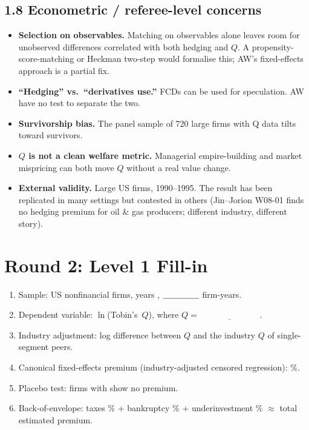 \documentclass[11pt]{article}
\newcommand{\blank}[1]{\underline{\hspace{#1}}}
\begin{document}
\subsection*{1.8 Econometric / referee-level concerns}
\begin{alertbox}
\begin{itemize}
\item \textbf{Selection on observables.} Matching on observables alone leaves room for unobserved differences correlated with both hedging and $Q$. A propensity-score-matching or Heckman two-step would formalise this; AW's fixed-effects approach is a partial fix.
\item \textbf{``Hedging'' vs.\ ``derivatives use.''} FCDs can be used for speculation. AW have no test to separate the two.
\item \textbf{Survivorship bias.} The panel sample of 720 large firms with Q data tilts toward survivors.
\item \textbf{$Q$ is not a clean welfare metric.} Managerial empire-building and market mispricing can both move $Q$ without a real value change.
\item \textbf{External validity.} Large US firms, 1990--1995. The result has been replicated in many settings but contested in others (Jin--Jorion W08-01 finds no hedging premium for oil \& gas producers; different industry, different story).
\end{itemize}
\end{alertbox}

\section*{Round 2: Level 1 Fill-in}
\begin{enumerate}
\item Sample: \blank{1cm} US nonfinancial firms, years \blank{2cm}, $\blank{1.5cm}$ firm-years.
\item Dependent variable: $\ln$(Tobin's~$Q$), where $Q=\blank{3cm}$.
\item Industry adjustment: log difference between $Q$ and the \blank{1.5cm} industry $Q$ of single-segment peers.
\item Canonical fixed-effects premium (industry-adjusted censored regression): \blank{1cm}\%.
\item Placebo test: firms with \blank{1.5cm} show no premium.
\item Back-of-envelope: taxes \blank{0.5cm}\% + bankruptcy \blank{0.8cm}\% + underinvestment \blank{0.8cm}\% $\approx$ total estimated premium.
\end{enumerate}
\end{document}
